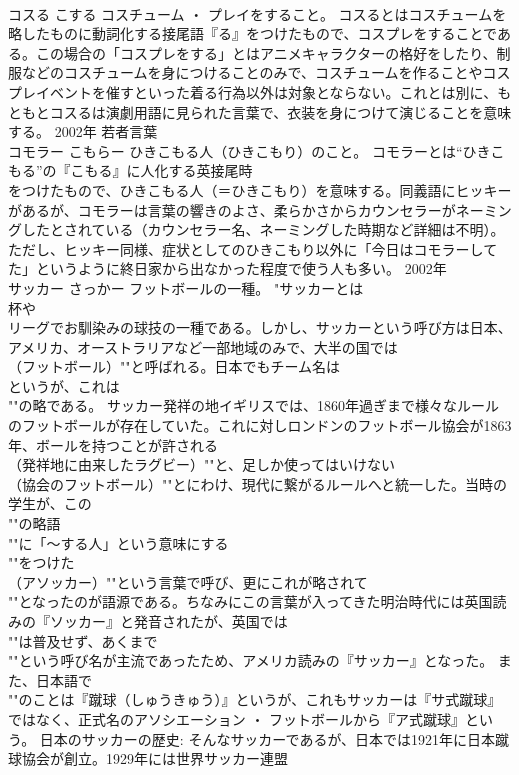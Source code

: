 \documentclass[8pt]{extreport}
\begin{document}
\begin{CJK}{UTF8}{min}
\\	コスる	こする	コスチューム ・ プレイをすること。	コスるとはコスチュームを略したものに動詞化する接尾語『る』をつけたもので、コスプレをすることである。この場合の「コスプレをする」とはアニメキャラクターの格好をしたり、制服などのコスチュームを身につけることのみで、コスチュームを作ることやコスプレイベントを催すといった着る行為以外は対象とならない。これとは別に、もともとコスるは演劇用語に見られた言葉で、衣装を身につけて演じることを意味する。	2002年	若者言葉	
\\	コモラー	こもらー	ひきこもる人（ひきこもり）のこと。	コモラーとは“ひきこもる”の『こもる』に人化する英接尾時
\\	をつけたもので、ひきこもる人（＝ひきこもり）を意味する。同義語にヒッキーがあるが、コモラーは言葉の響きのよさ、柔らかさからカウンセラーがネーミングしたとされている（カウンセラー名、ネーミングした時期など詳細は不明）。ただし、ヒッキー同様、症状としてのひきこもり以外に「今日はコモラーしてた」というように終日家から出なかった程度で使う人も多い。	2002年	
\\	サッカー	さっかー	フットボールの一種。	"サッカーとは
\\	杯や
\\	リーグでお馴染みの球技の一種である。しかし、サッカーという呼び方は日本、アメリカ、オーストラリアなど一部地域のみで、大半の国では
\\	（フットボール）""と呼ばれる。日本でもチーム名は
\\	というが、これは
\\	""の略である。 サッカー発祥の地イギリスでは、1860年過ぎまで様々なルールのフットボールが存在していた。これに対しロンドンのフットボール協会が1863年、ボールを持つことが許される
\\	（発祥地に由来したラグビー）""と、足しか使ってはいけない
\\	（協会のフットボール）""とにわけ、現代に繋がるルールへと統一した。当時の学生が、この
\\	""の略語
\\	""に「～する人」という意味にする
\\	""をつけた
\\	（アソッカー）""という言葉で呼び、更にこれが略されて
\\	""となったのが語源である。ちなみにこの言葉が入ってきた明治時代には英国読みの『ソッカー』と発音されたが、英国では
\\	""は普及せず、あくまで
\\	""という呼び名が主流であったため、アメリカ読みの『サッカー』となった。 また、日本語で
\\	""のことは『蹴球（しゅうきゅう）』というが、これもサッカーは『サ式蹴球』ではなく、正式名のアソシエーション ・ フットボールから『ア式蹴球』という。 日本のサッカーの歴史: そんなサッカーであるが、日本では1921年に日本蹴球協会が創立。1929年には世界サッカー連盟

\end{CJK}
\end{document}
